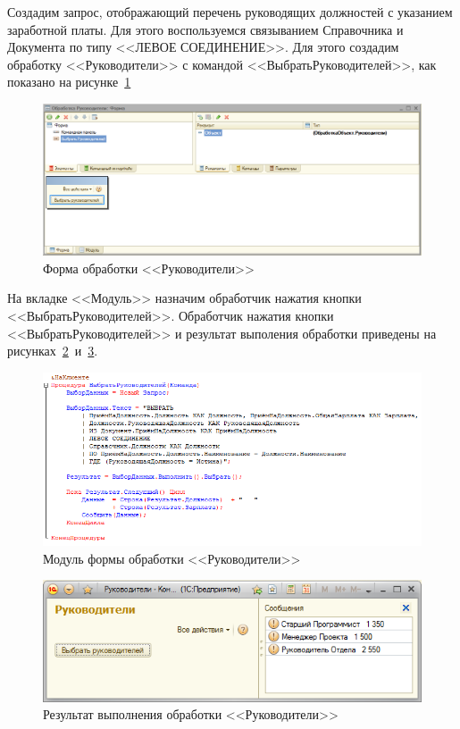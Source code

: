 Создадим запрос, отображающий перечень руководящих должностей
с указанием заработной платы. Для этого воспользуемся связыванием
Справочника и Документа по типу <<ЛЕВОЕ СОЕДИНЕНИЕ>>.
Для этого создадим обработку <<Руководители>>
с командой <<ВыбратьРуководителей>>, как показано на рисунке~\ref{fig:managers_form}
\begin{figure}[h!]
  \centering
  \includegraphics[width=130mm]{pic/managers_form}
  \caption{Форма обработки <<Руководители>>}
  \label{fig:managers_form}
\end{figure}

\pagebreak

На вкладке <<Модуль>> назначим обработчик нажатия кнопки <<ВыбратьРуководителей>>.
Обработчик нажатия кнопки <<ВыбратьРуководителей>> и результат выполения обработки
приведены на рисунках~\ref{fig:managers_code}~и~\ref{fig:managers_results}.
\begin{figure}[h!]
  \centering
  \includegraphics[width=150mm]{pic/managers_code}
  \caption{Модуль формы обработки <<Руководители>>}
  \label{fig:managers_code}
\end{figure}
\begin{figure}[h!]
  \centering
  \includegraphics[width=140mm]{pic/managers_results}
  \caption{Результат выполнения обработки <<Руководители>>}
  \label{fig:managers_results}
\end{figure}

